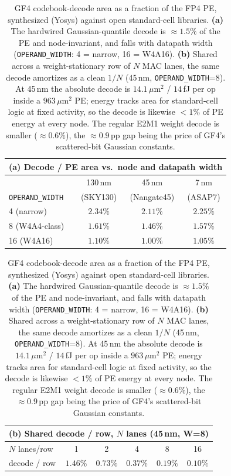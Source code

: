 \begin{table}[t]
  \centering
  \caption{GF4 codebook-decode area as a fraction of the FP4 PE, synthesized
  (Yosys) against open standard-cell libraries. \textbf{(a)} The hardwired
  Gaussian-quantile decode is $\approx\!1.5\%$ of the PE and node-invariant, and
  falls with datapath width (\texttt{OPERAND\_WIDTH}: 4 = narrow, 16 = W4A16).
  \textbf{(b)} Shared across a weight-stationary row of $N$ MAC lanes, the same
  decode amortizes as a clean $1/N$ (45\,nm, \texttt{OPERAND\_WIDTH}=8). At
  45\,nm the absolute decode is $14.1\,\mu\text{m}^2$ / $14$\,fJ per op inside a
  $963\,\mu\text{m}^2$ PE; energy tracks area for standard-cell logic at fixed
  activity, so the decode is likewise $<\!1\%$ of PE energy at every node. The
  regular E2M1 weight decode is smaller ($\approx\!0.6\%$), the $\approx\!0.9$\,pp
  gap being the price of GF4's scattered-bit Gaussian constants.}
  \label{tab:node-scaling}
  \small

  \begin{tabular}{lccc}
    \toprule
    \multicolumn{4}{c}{(a) Decode / PE area vs.\ node and datapath width} \\
    \midrule
    & 130\,nm & 45\,nm & 7\,nm \\
    \texttt{OPERAND\_WIDTH} & (SKY130) & (Nangate45) & (ASAP7) \\
    \midrule
    4 \quad (narrow)      & $2.34\%$ & $2.11\%$ & $2.25\%$ \\
    8 \quad (W4A4-class)  & $1.61\%$ & $1.46\%$ & $1.57\%$ \\
    16 \quad (W4A16)      & $1.10\%$ & $1.00\%$ & $1.05\%$ \\
    \bottomrule
  \end{tabular}

  \vspace{1.5ex}

  \begin{tabular}{lccccc}
    \toprule
    \multicolumn{6}{c}{(b) Shared decode / row, $N$ lanes (45\,nm, W=8)} \\
    \midrule
    $N$ lanes/row  & 1 & 2 & 4 & 8 & 16 \\
    \midrule
    decode / row   & $1.46\%$ & $0.73\%$ & $0.37\%$ & $0.19\%$ & $0.10\%$ \\
    \bottomrule
  \end{tabular}
\end{table}
